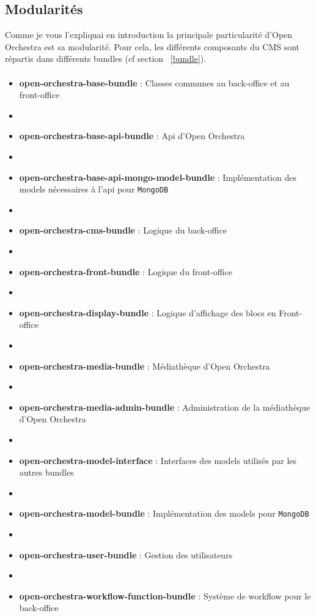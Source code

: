    \subsection{Modularités}
   Comme je vous l'expliquai en introduction la principale particularité d'Open Orchestra est sa modularité. Pour cela, les différents composants du CMS sont répartis dans différents bundles (cf section ~\ref{bundle}).
   \paragraph{}
   \begin{itemize}
   \item \textbf{open-orchestra-base-bundle} : Classes communes au back-office et au front-office
            \item[]
   \item \textbf{open-orchestra-base-api-bundle} : Api d'Open Orchestra
         \item[]   
   \item \textbf{open-orchestra-base-api-mongo-model-bundle} : Implémentation des models nécessaires à l'api pour \verb?MongoDB? 
            \item[]
   \item \textbf{open-orchestra-cms-bundle} : Logique du back-office
            \item[]
   \item \textbf{open-orchestra-front-bundle} : Logique du front-office
            \item[]
   \item \textbf{open-orchestra-display-bundle} : Logique d'affichage des blocs en Front-office
            \item[]
   \item \textbf{open-orchestra-media-bundle} : Médiathèque d'Open Orchestra
            \item[]
   \item \textbf{open-orchestra-media-admin-bundle} : Administration de la médiathèque d'Open Orchestra
            \item[]
   \item \textbf{open-orchestra-model-interface} : Interfaces des models utilisés par les autres bundles 
            \item[]
   \item \textbf{open-orchestra-model-bundle} : Implémentation des models pour \verb?MongoDB? 
            \item[]
   \item \textbf{open-orchestra-user-bundle} : Gestion des utilisateurs 
            \item[]
   \item \textbf{open-orchestra-workflow-function-bundle} : Système de workflow pour le back-office 
   \end{itemize}
